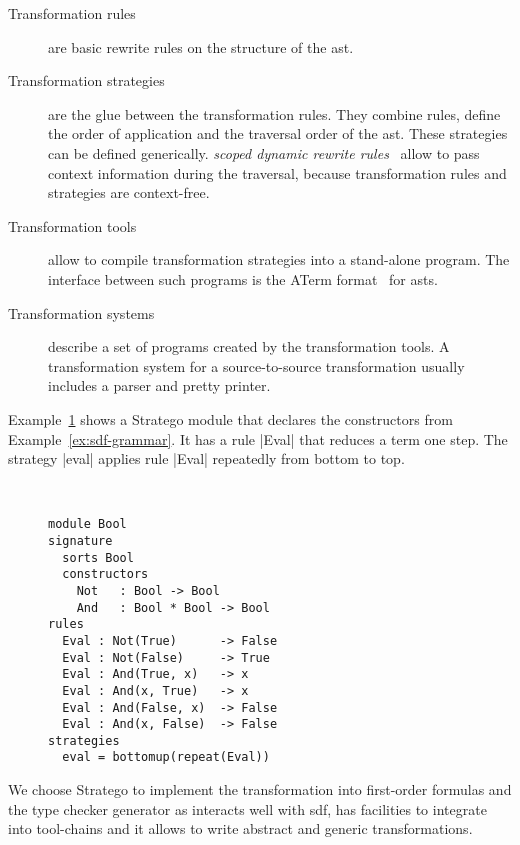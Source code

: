 \begin{description}
\item[Transformation rules] are basic rewrite rules on the structure
  of the \gls{ast}.
\item[Transformation strategies] are the glue between the
  transformation rules. They combine rules, define the order of
  application and the traversal order of the \gls{ast}. These
  strategies can be defined generically. \textit{scoped dynamic
    rewrite rules}~\cite{Visser01scopeddynamic} allow to pass context
  information during the traversal, because transformation rules and
  strategies are context-free.
\item[Transformation tools] allow to compile transformation strategies
  into a stand-alone program. The interface between such programs is
  the ATerm format~\cite{VandenBrand:2000:EAT:343460.343468} for
  \glspl{ast}.
\item[Transformation systems] describe a set of programs created by
  the transformation tools. A transformation system for a
  source-to-source transformation usually includes a parser and pretty
  printer.
\end{description}

Example~\ref{ex:stratego-module} shows a Stratego module that declares
the constructors from Example~\ref{ex:sdf-grammar}. It has a rule
\code|Eval| that reduces a term one step. The strategy \code|eval|
applies rule \code|Eval| repeatedly from bottom to top.

\begin{figure}
\begin{example}{~}
\begin{lstlisting}[language=stratego]
module Bool
signature
  sorts Bool
  constructors
    Not   : Bool -> Bool 
    And   : Bool * Bool -> Bool
rules
  Eval : Not(True)      -> False
  Eval : Not(False)     -> True
  Eval : And(True, x)   -> x
  Eval : And(x, True)   -> x
  Eval : And(False, x)  -> False
  Eval : And(x, False)  -> False
strategies
  eval = bottomup(repeat(Eval))
\end{lstlisting}
\label{ex:stratego-module}
\end{example}
\end{figure}

We choose Stratego to implement the transformation into first-order
formulas and the type checker generator as interacts well with
\gls{sdf}, has facilities to integrate into tool-chains and it allows
to write abstract and generic transformations.

